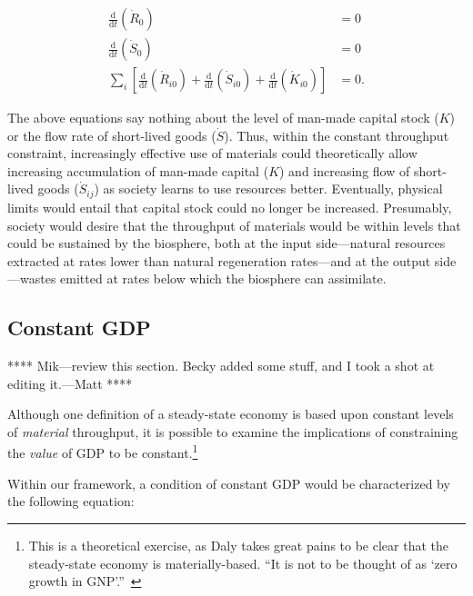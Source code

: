 \begin{align}\label{eq:const_throughput}
	\frac{\mathrm{d}}{\mathrm{d}t}\left(\dot{R}_{0}\right)		&
	= 0																							\\
	\frac{\mathrm{d}}{\mathrm{d}t}\left(\dot{S}_{0}\right)		&
	= 0																						\\
	\sum\limits_{i}
			\left[
				\frac{\mathrm{d}}{\mathrm{d}t}\left(\dot{R}_{i0}\right)
				+ \frac{\mathrm{d}}{\mathrm{d}t}\left(\dot{S}_{i0}\right)
				+ \frac{\mathrm{d}}{\mathrm{d}t}\left(\dot{K}_{i0}\right)
			\right]																			&
	= 0.
\end{align}

The above equations say nothing about the level 
of man-made capital stock ($K$)
or the flow rate of short-lived goods ($\dot{S}$).
Thus, within the constant throughput constraint,
increasingly effective use of materials could
theoretically allow increasing accumulation
of man-made capital ($K$) 
and increasing flow of short-lived goods ($\dot{S}_{ij}$)
as society learns to use resources better.
Eventually,
physical limits would entail that capital
stock could no longer be increased.
Presumably,
society would desire that the throughput of
materials would be within levels that could
be sustained by the biosphere,
both at the input side---natural 
resources extracted at rates lower
than natural regeneration rates---and 
at the output side---wastes emitted 
at rates below which
the biosphere can assimilate.


\subsection{Constant GDP}


**** Mik---review this section. Becky added some stuff, 
and I took a shot at editing it.---Matt ****

Although one definition of a steady-state economy is
based upon constant levels of \emph{material} throughput,
it is possible to examine the implications of constraining the \emph{value} of 
GDP to be constant.\footnote{This is a theoretical exercise, 
	as Daly takes great pains to be clear that 
	the steady-state economy is materially-based. ``It is not
	to be thought of as `zero growth in GNP'.''~\cite[p. 32]{Daly1996}}

Within our framework,
a condition of constant GDP would be
characterized by the following equation:

